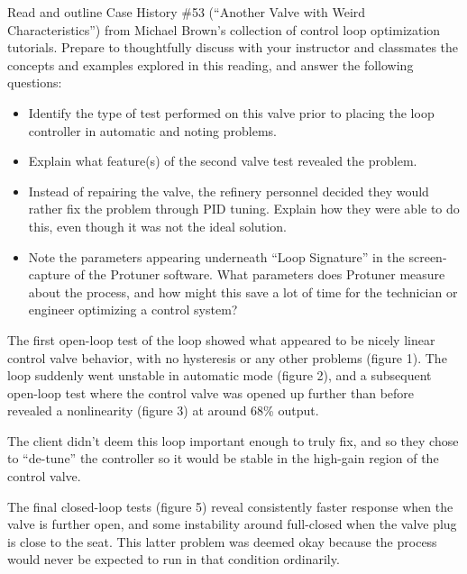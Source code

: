 

Read and outline Case History \#53 (``Another Valve with Weird Characteristics'') from Michael Brown's collection of control loop optimization tutorials.  Prepare to thoughtfully discuss with your instructor and classmates the concepts and examples explored in this reading, and answer the following questions:

\begin{itemize}
\item{} Identify the type of test performed on this valve prior to placing the loop controller in automatic and noting problems.
\vskip 10pt
\item{} Explain what feature(s) of the second valve test revealed the problem.
\vskip 10pt
\item{} Instead of repairing the valve, the refinery personnel decided they would rather fix the problem through PID tuning.  Explain how they were able to do this, even though it was not the ideal solution.
\vskip 10pt
\item{} Note the parameters appearing underneath ``Loop Signature'' in the screen-capture of the Protuner software.  What parameters does Protuner measure about the process, and how might this save a lot of time for the technician or engineer optimizing a control system?
\end{itemize}














The first open-loop test of the loop showed what appeared to be nicely linear control valve behavior, with no hysteresis or any other problems (figure 1).  The loop suddenly went unstable in automatic mode (figure 2), and a subsequent open-loop test where the control valve was opened up further than before revealed a nonlinearity (figure 3) at around 68\% output.

\vskip 10pt

The client didn't deem this loop important enough to truly fix, and so they chose to ``de-tune'' the controller so it would be stable in the high-gain region of the control valve.

\vskip 10pt

The final closed-loop tests (figure 5) reveal consistently faster response when the valve is further open, and some instability around full-closed when the valve plug is close to the seat.  This latter problem was deemed okay because the process would never be expected to run in that condition ordinarily.







